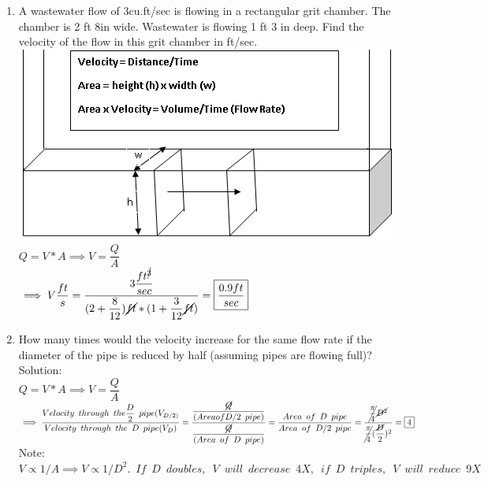 \documentclass{article}
\begin{document}
\begin{enumerate}
\item A wastewater flow of 3cu.ft/sec is flowing in a rectangular grit chamber.  The chamber is 2 ft 8in wide.  Wastewater is flowing 1 ft 3 in deep.  Find the velocity of the flow in this grit chamber in ft/sec.\\
\vspace{0.5cm}
\includegraphics[scale=0.5]{ChannelFlow3}\\
$Q=V*A \implies V=\dfrac{Q}{A}$\\
$\implies V\dfrac{ft}{s}=\dfrac{3\dfrac{ft^{\cancel{3}}}{sec}}{(2 +\dfrac{8}{12})\cancel{ft} * (1+\dfrac{3}{12} \cancel{ft})}=\boxed{\dfrac{0.9ft}{sec}}$
\item How many times would the velocity increase for the same flow rate if the diameter of the pipe is reduced by half (assuming pipes are flowing full)?\\
Solution:\\
$Q=V*A \implies V=\dfrac{Q}{A}$\\
$\implies \dfrac{Velocity \enspace through \enspace the \dfrac{D}{2} \enspace pipe (V_{D/2)}}{Velocity \enspace through \enspace the \enspace D \enspace pipe (V_D)}=\dfrac{\dfrac{\cancel{Q}}{(Area of D/2 \enspace pipe)}}{\dfrac{\cancel{Q}}{(Area \enspace of \enspace D \enspace pipe)}}=\dfrac{Area \enspace of \enspace D \enspace pipe}{Area \enspace of \enspace D/2 \enspace pipe}=\dfrac{\cancel{\dfrac{\pi}{4}}\cancel{D^2}}{\cancel{\dfrac{\pi}{4}}(\dfrac{\cancel{D}}{2})^2}=\boxed{4}$
Note: $V \propto 1/A \implies V \propto 1/D^2. \enspace If \enspace D \enspace doubles,\enspace V \enspace will \enspace decrease \enspace 4X, \enspace if \enspace D \enspace triples, \enspace V \enspace will \enspace reduce \enspace 9X$


\end{enumerate}
\end{document}
